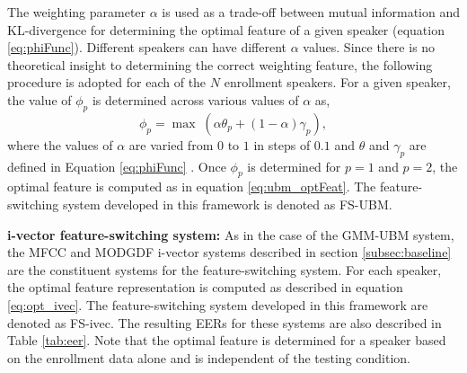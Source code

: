 \documentclass[preprint,12pt,5p]{elsarticle}
\begin{document}
The weighting parameter $\alpha$ is used as a trade-off between mutual information and
KL-divergence for determining the optimal feature of a given speaker (equation
\ref{eq:phiFunc}). Different speakers can have different $\alpha$ values. Since
there is no theoretical insight to determining the correct weighting feature,
the following procedure is adopted for each of the $N$ enrollment speakers.
For a given speaker, the value of $\phi_p$ is determined across various values
of $\alpha$ as, 
\begin{equation}
\phi_p = \max \; (\alpha \theta_p + (1-\alpha) \gamma_p),
\end{equation}
where the values of $\alpha$ are varied from $0$ to $1$ in steps of $0.1$ and $\theta$ and 
$\gamma_p$ are defined in Equation \ref{eq:phiFunc} . Once
$\phi_p$ is determined for $p=1$ and $p=2$, the optimal feature is computed as in equation
\ref{eq:ubm_optFeat}.
The feature-switching system developed in this framework is denoted as
FS-UBM. 


\textbf{i-vector feature-switching system:}
As in the case of the GMM-UBM system, the MFCC and MODGDF i-vector systems
described in section \ref{subsec:baseline} are the constituent systems for the
feature-switching system. For each speaker, the optimal feature representation
is computed as described in equation \ref{eq:opt_ivec}. The feature-switching 
system developed in this framework are denoted as FS-ivec. 
The resulting EERs for these systems are also described in Table \ref{tab:eer}.
Note that the optimal feature is determined for a speaker based on the enrollment data
alone and is independent of the testing condition.
\end{document}
